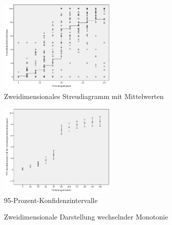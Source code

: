 \documentclass[a4paper]{thesis}
\begin{document}
\begin{figure}[H]
\centering
\includegraphics[width=0.5\textwidth]{figures/streu_2d_mittel.png}
\caption[Zweidimensionales Streudiagramm mit Mittelwerten]{Zweidimensionales Streudiagramm mit Mittelwerten}
\end{figure}

\begin{figure}[H]
\centering
\includegraphics[width=0.5\textwidth]{figures/konfi.png}
\caption[95-Prozent-Konfidenzintervalle]{95-Prozent-Konfidenzintervalle}
\end{figure}

\begin{figure}[H]
\begin{center}
\end{center}
\caption[Zweidimensionale Darstellung wechselnder Monotonie]{Zweidimensionale Darstellung wechselnder Monotonie}
\end{figure}
\end{document}
